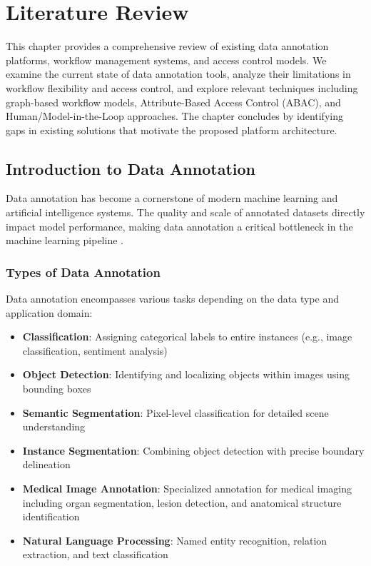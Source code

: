 \chapter{Literature Review}
\label{chap:literature-review}

\begin{ChapAbstract}
This chapter provides a comprehensive review of existing data annotation platforms, workflow management systems, and access control models. We examine the current state of data annotation tools, analyze their limitations in workflow flexibility and access control, and explore relevant techniques including graph-based workflow models, Attribute-Based Access Control (ABAC), and Human/Model-in-the-Loop approaches. The chapter concludes by identifying gaps in existing solutions that motivate the proposed platform architecture.
\end{ChapAbstract}

\section{Introduction to Data Annotation}
\label{sec:data-annotation-intro}

Data annotation has become a cornerstone of modern machine learning and artificial intelligence systems. The quality and scale of annotated datasets directly impact model performance, making data annotation a critical bottleneck in the machine learning pipeline \cite{roh2019survey}.

\subsection{Types of Data Annotation}

Data annotation encompasses various tasks depending on the data type and application domain:

\begin{itemize}
    \item \textbf{Classification}: Assigning categorical labels to entire instances (e.g., image classification, sentiment analysis)
    \item \textbf{Object Detection}: Identifying and localizing objects within images using bounding boxes
    \item \textbf{Semantic Segmentation}: Pixel-level classification for detailed scene understanding
    \item \textbf{Instance Segmentation}: Combining object detection with precise boundary delineation
    \item \textbf{Medical Image Annotation}: Specialized annotation for medical imaging including organ segmentation, lesion detection, and anatomical structure identification
    \item \textbf{Natural Language Processing}: Named entity recognition, relation extraction, and text classification
\end{itemize}

